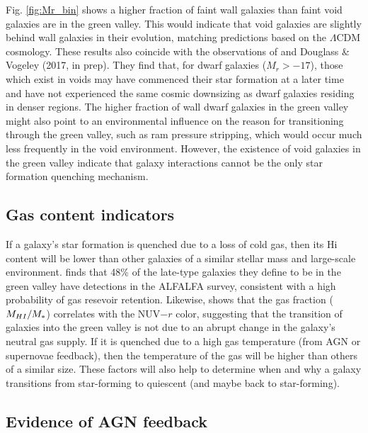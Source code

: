 Fig. \ref{fig:Mr_bin} shows a higher fraction of faint wall galaxies than faint 
void galaxies are in the green valley.  This would indicate that void galaxies 
are slightly behind wall galaxies in their evolution, matching predictions based 
on the $\Lambda$CDM cosmology.  These results also coincide with the 
observations of \cite{Douglass17b} and Douglass \& Vogeley (2017, in prep).  
They find that, for dwarf galaxies ($M_r > -17$), those which exist in voids may 
have commenced their star formation at a later time and have not experienced the 
same cosmic downsizing as dwarf galaxies residing in denser regions.  The higher 
fraction of wall dwarf galaxies in the green valley might also point to an 
environmental influence on the reason for transitioning through the green 
valley, such as ram pressure stripping, which would occur much less frequently 
in the void environment.  However, the existence of void galaxies in the green 
valley indicate that galaxy interactions cannot be the only star formation 
quenching mechanism.


\subsection{Gas content indicators}

If a galaxy's star formation is quenched due to a loss of cold gas, then its 
H{\sc i} content will be lower than other galaxies of a similar stellar mass and 
large-scale environment.  \cite{Schawinski14} finds that 48\% of the late-type 
galaxies they define to be in the green valley have  detections in the 
ALFALFA survey, consistent with a high probability of gas resevoir retention.  
Likewise, \cite{Catinella12} shows that the gas fraction ($M_{\ion{H}{1}}/M_*$) 
correlates with the NUV$-r$ color, suggesting that the transition of galaxies 
into the green valley is not due to an abrupt change in the galaxy's neutral gas 
supply.  If it is quenched due to a high gas temperature (from AGN or supernovae 
feedback), then the temperature of the gas will be higher than others of a 
similar size.  These factors will also help to determine when and why a galaxy 
transitions from star-forming to quiescent (and maybe back to star-forming).


\subsection{Evidence of AGN feedback}

